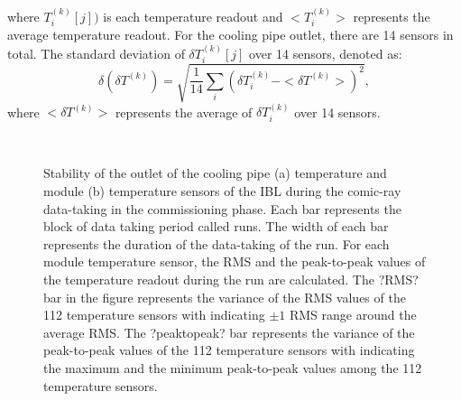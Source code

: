 where $T^{(k)}_i[j])$ is each temperature readout and $<T^{(k)}_i>$ represents the average temperature readout.
For the cooling pipe outlet, there are 14 sensors in total. The standard deviation of $\delta T^{(k)}_i[j]$ over 14 sensors, denoted as:
\begin{equation}
\delta(\delta T^{(k)}) = \sqrt{\frac{1}{14} \sum_i {(\delta T^{(k)}_i - <\delta T^{(k)}>)^2}},
\end{equation}
where $<\delta T^{(k)}>$ represents the average of $\delta T^{(k)}_i$ over 14 sensors.
\begin{figure}
\centering
{}\\
\caption{Stability of the outlet of the cooling pipe (a) temperature and module (b) temperature sensors of the IBL during the comic-ray data-taking in the commissioning phase. Each bar represents the block of data taking period called runs. The width of each bar represents the duration of the data-taking of the run. For each module temperature sensor, the RMS and the peak-to-peak values
of the temperature readout during the run are calculated. The ?RMS? bar in the figure represents the variance of the
RMS values of the 112 temperature sensors with indicating $\pm 1$ RMS range around the average RMS. The ?peaktopeak? bar represents the variance of the peak-to-peak values of the 112 temperature sensors with indicating the maximum and the minimum peak-to-peak values among the 112 temperature sensors.}
\end{figure}
